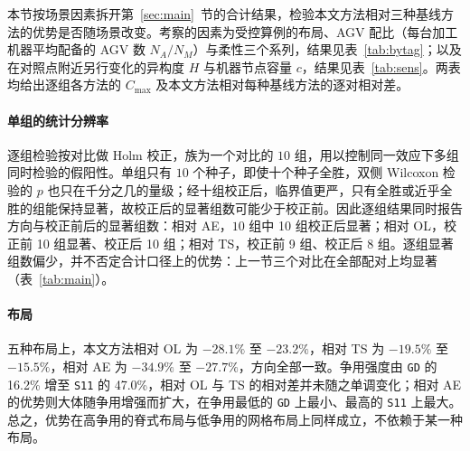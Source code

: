 \documentclass[manuscript,screen,review]{acmart}
\newcommand{\NCases}{10}
\newcommand{\NSeeds}{10}
\newcommand{\ScnOLSig}{10}
\newcommand{\ScnOLSigRaw}{10}
\newcommand{\ScnOLRangeA}{$-28.1\%$ 至 $-23.2\%$}
\newcommand{\ScnTSSig}{8}
\newcommand{\ScnTSSigRaw}{9}
\newcommand{\ScnTSRangeA}{$-19.5\%$ 至 $-15.5\%$}
\newcommand{\ScnAESig}{10}
\newcommand{\ScnAERangeA}{$-34.9\%$ 至 $-27.7\%$}
\newcommand{\ContentionLo}{16.2\%}
\newcommand{\ContentionAHi}{47.0\%}
\begin{document}
本节按场景因素拆开第~\ref{sec:main}~节的合计结果，检验本文方法相对三种基线方法的优势是否随场景改变。考察的因素为受控算例的布局、AGV 配比（每台加工机器平均配备的 AGV 数 $N_A/N_M$）与柔性三个系列，结果见表~\ref{tab:bytag}；以及在对照点附近另行变化的异构度 $H$ 与机器节点容量 $c$，结果见表~\ref{tab:sens}。两表均给出逐组各方法的 $C_{\max}$ 及本文方法相对每种基线方法的逐对相对差。

\paragraph{单组的统计分辨率}
逐组检验按对比做 Holm 校正，族为一个对比的 $\NCases$ 组，用以控制同一效应下多组同时检验的假阳性。单组只有 $\NSeeds$ 个种子，即使十个种子全胜，双侧 Wilcoxon 检验的 $p$ 也只在千分之几的量级；经十组校正后，临界值更严，只有全胜或近乎全胜的组能保持显著，故校正后的显著组数可能少于校正前。因此逐组结果同时报告方向与校正前后的显著组数：相对 AE，$\NCases$ 组中 \ScnAESig{} 组校正后显著；相对 OL，校正前 \ScnOLSigRaw{} 组显著、校正后 \ScnOLSig{} 组；相对 TS，校正前 \ScnTSSigRaw{} 组、校正后 \ScnTSSig{} 组。逐组显著组数偏少，并不否定合计口径上的优势：上一节三个对比在全部配对上均显著（表~\ref{tab:main}）。

\begin{table}[t]
\caption{逐组各方法的完工时间及本文方法相对三种基线方法的逐对相对差，按三个系列分块（每组 $n=\NSeeds$ 个按种子配对的比较）。
显著性标记按 \textbf{Holm 校正后}的 $p$ 给出（双侧 Wilcoxon 符号秩检验），族为一个对比的
$\NCases$ 组：$^{*}p<0.05$、$^{**}p<0.01$；$^{\dagger}$ 表示校正前显著、校正后不显著。
负值表示本文方法的完工时间更低。相对差与表~\ref{tab:main} 为同一估计量（逐对相对差在种子上的均值），不能由同行两个均值相除得到。
\texttt{S11} 同时是 AGV 配比系列的 $N_A/N_M=1.5$ 与柔性系列的 $F=0.6$，只运行一次，只列一行。}
\label{tab:bytag}
\small

\end{table}

\paragraph{布局}
五种布局上，本文方法相对 OL 为 \ScnOLRangeA{}，相对 TS 为 \ScnTSRangeA{}，相对 AE 为 \ScnAERangeA{}，方向全部一致。争用强度由 \texttt{GD} 的 \ContentionLo{} 增至 \texttt{S11} 的 \ContentionAHi{}，相对 OL 与 TS 的相对差并未随之单调变化；相对 AE 的优势则大体随争用增强而扩大，在争用最低的 \texttt{GD} 上最小、最高的 \texttt{S11} 上最大。总之，优势在高争用的脊式布局与低争用的网格布局上同样成立，不依赖于某一种布局。
\end{document}
